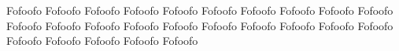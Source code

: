 \documentclass{article}
\makeatletter
\newcommand*{\shifttext}[2]{%
  \settowidth{\@tempdima}{#2}%
  \makebox[\@tempdima]{\hspace*{#1}#2}%
}
\renewcommand{\newtheorem}[2]
{\expandafter\NewEnviron{#1}[1][]
{
\shifttext{-1.6cm}{\begin{tikzpicture}
    \draw[fill=black] (0,0) circle[radius=.3];
    \node[white] at (0,0) {\stationfont \thetheorem};
    \node[right] at (.3,0) {\stationfont #2};
    \draw[gray] (.3, -.2) -- (\textwidth, -.2);
    \end{tikzpicture}}
\begin{minipage}{\dimexpr\textwidth-1cm\relax}
    \BODY
\end{minipage}
}
}
\newtheorem{theorem}{Theorem}
\makeatother
\begin{document}
\begin{theorem}
    Fofoofo  Fofoofo  Fofoofo  Fofoofo  Fofoofo  Fofoofo  Fofoofo  Fofoofo  Fofoofo  Fofoofo  Fofoofo  Fofoofo  Fofoofo  Fofoofo  Fofoofo  Fofoofo  Fofoofo  Fofoofo  Fofoofo  Fofoofo  Fofoofo  Fofoofo  Fofoofo  Fofoofo  Fofoofo
\end{theorem}
\end{document}
